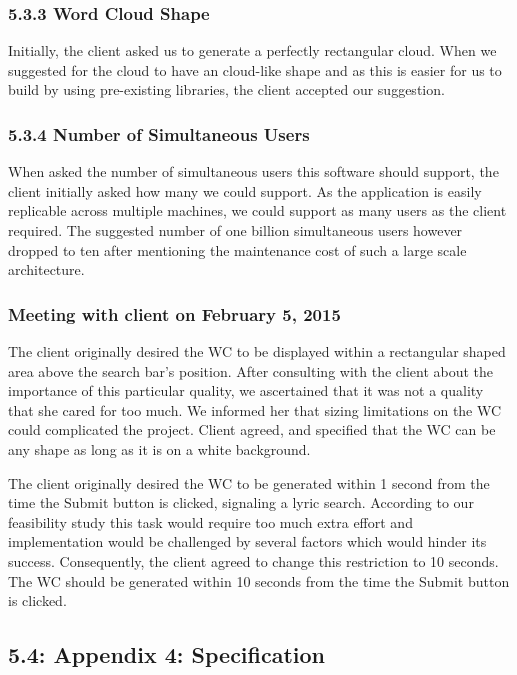 \documentclass[]{article}
\begin{document}
\subsubsection{5.3.3 Word Cloud Shape}\label{word-cloud-shape}

Initially, the client asked us to generate a perfectly rectangular
cloud. When we suggested for the cloud to have an cloud-like shape and
as this is easier for us to build by using pre-existing libraries, the
client accepted our suggestion.

\subsubsection{5.3.4 Number of Simultaneous
Users}\label{number-of-simultaneous-users}

When asked the number of simultaneous users this software should
support, the client initially asked how many we could support. As the
application is easily replicable across multiple machines, we could
support as many users as the client required. The suggested number of
one billion simultaneous users however dropped to ten after mentioning
the maintenance cost of such a large scale architecture.

\subsubsection{Meeting with client on February 5,
2015}\label{meeting-with-client-on-february-5-2015}

The client originally desired the WC to be displayed within a
rectangular shaped area above the search bar's position. After
consulting with the client about the importance of this particular
quality, we ascertained that it was not a quality that she cared for too
much. We informed her that sizing limitations on the WC could
complicated the project. Client agreed, and specified that the WC can be
any shape as long as it is on a white background.

The client originally desired the WC to be generated within 1 second
from the time the Submit button is clicked, signaling a lyric search.
According to our feasibility study this task would require too
much extra effort and implementation would be challenged by several
factors which would hinder its success. Consequently, the client agreed
to change this restriction to 10 seconds. The WC should be generated
within 10 seconds from the time the Submit button is clicked.

\subsection{5.4: Appendix 4:
Specification}\label{appendix-4-specification}
\end{document}

